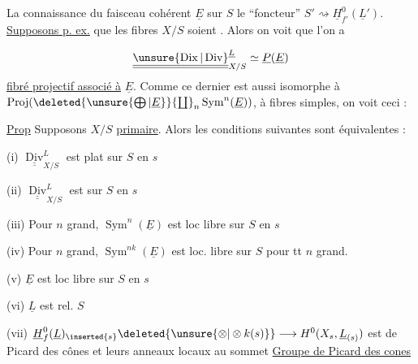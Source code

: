 La connaissance du faisceau cohérent $\underline E$ sur $S$  le ``foncteur'' $S'\rightsquigarrow\underline H^0_{f'}(\underline L')$. \uline{Supposons p. ex.} que
les fibres  $X/S$ soient  . Alors on voit que l'on a

\[
\underline{\underline{\unsure{\operatorname{Dix}|\operatorname{Div}}}}_{X/S}^{\underline L}\simeq\underline P(\underline E)
\]
\uline{fibré projectif associé à} $\underline E$. Comme ce dernier est aussi isomorphe à $\operatorname{Proj}(\deleted{\unsure{\bigoplus|\underline E}}{\textstyle\coprod}_n\operatorname{Sym}^{n}(\underline E))$,  à fibres simples, on voit ceci :

\uline{Prop} Supposons $X/S$ \uline{primaire}. Alors  les conditions suivantes sont équivalentes :

(i) $\underline{\underline{\operatorname{Div}}}_{X/S}^{L}$ est plat sur $S$ en $s$

(ii) $\underline{\underline{\operatorname{Div}}}_{X/S}^{L}$ est  sur $S$ en $s$

(iii) Pour $n$ grand, $\operatorname{Sym}^{n}(\underline E)$ est loc libre sur $S$ en $s$

(iv) Pour  $n$ grand, $\operatorname{Sym}^{nk}(\underline E)$ est loc. libre sur $S$  pour tt $n$ grand.

(v) $\underline E$ est  loc libre sur $S$ en $s$

(vi) $\underline L$ est  rel. $S$

(vii) $\underline H_f^0(\underline L)_{\inserted{s}}\deleted{\unsure{\otimes|\otimes k(s)}}\longrightarrow H^0(X_s,\underline L_{(s)})$ est 
 de Picard des cônes et  leurs anneaux locaux au sommet
\uline{Groupe de Picard des cones} \uline{}

